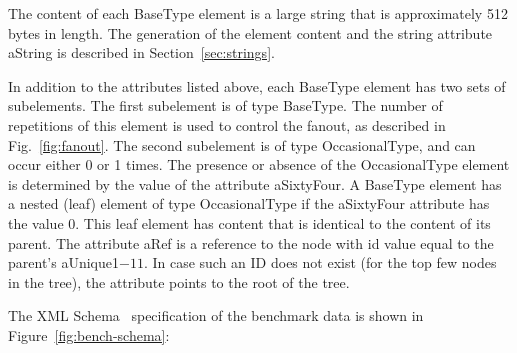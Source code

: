 The content of each {\sf BaseType} element is a large string that is
approximately 512 bytes in length. The generation of the element
content and the string attribute {\sf aString} is described in
Section~\ref{sec:strings}.

In addition to the attributes listed above, each {\sf BaseType}
element has two sets of subelements. The first subelement is of type
{\sf BaseType}. The number of repetitions of this element is used to
control the fanout, as described in Fig.~\ref{fig:fanout}.  The second
subelement is of type {\sf OccasionalType}, and can occur either 0 or 1
times.  The presence or absence of the {\sf OccasionalType} element is
determined by the value of the attribute {\sf aSixtyFour}.  A {\sf
BaseType} element has a nested (leaf) element of type {\sf
OccasionalType} if the {\sf aSixtyFour} attribute has the value 0.
This leaf element has content that is identical to the content of its
parent.  The attribute {\sf aRef} is a reference to the node with id
value equal to the parent's {\sf aUnique1}$-11$. In case such an ID
does not exist (for the top few nodes in the tree), the attribute
points to the root of the tree.

The XML Schema~\cite{xml-schema} specification of the benchmark data
is shown in Figure~\ref{fig:bench-schema}:


